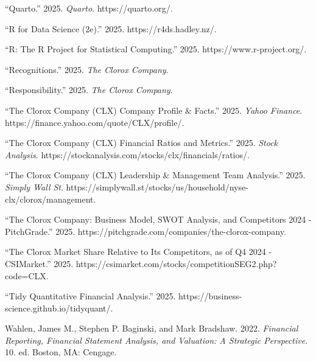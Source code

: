 \documentclass[
  letterpaper,
  DIV=11,
  numbers=noendperiod]{scrartcl}
\newlength{\cslhangindent}
\newenvironment{CSLReferences}[2] %
 {\begin{list}{}{%
  \setlength{\itemindent}{0pt}
  \setlength{\leftmargin}{0pt}
  \setlength{\parsep}{0pt}
  \ifodd #1
   \setlength{\leftmargin}{\cslhangindent}
   \setlength{\itemindent}{-1\cslhangindent}
  \fi
  \setlength{\itemsep}{#2\baselineskip}}}
 {\end{list}}
\begin{document}
\begin{CSLReferences}{1}{0}
{``Quarto.''} 2025. \emph{Quarto}. https://quarto.org/.

{``R for {Data Science} (2e).''} 2025. https://r4ds.hadley.nz/.

{``R: {The R Project} for {Statistical Computing}.''} 2025.
https://www.r-project.org/.

{``Recognitions.''} 2025. \emph{The Clorox Company}.

{``Responsibility.''} 2025. \emph{The Clorox Company}.

{``The {Clorox Company} ({CLX}) {Company Profile} \& {Facts}.''} 2025.
\emph{Yahoo Finance}. https://finance.yahoo.com/quote/CLX/profile/.

{``The {Clorox Company} ({CLX}) {Financial Ratios} and {Metrics}.''}
2025. \emph{Stock Analysis}.
https://stockanalysis.com/stocks/clx/financials/ratios/.

{``The {Clorox Company} ({CLX}) {Leadership} \& {Management Team
Analysis}.''} 2025. \emph{Simply Wall St}.
https://simplywall.st/stocks/us/household/nyse-clx/clorox/management.

{``The {Clorox Company}: {Business Model}, {SWOT Analysis}, and
{Competitors} 2024 - {PitchGrade}.''} 2025.
https://pitchgrade.com/companies/the-clorox-company.

{``The {Clorox Market} Share Relative to Its Competitors, as of {Q4}
2024 - {CSIMarket}.''} 2025.
https://csimarket.com/stocks/competitionSEG2.php?code=CLX.

{``Tidy {Quantitative Financial Analysis}.''} 2025.
https://business-science.github.io/tidyquant/.

Wahlen, James M., Stephen P. Baginski, and Mark Bradshaw. 2022.
\emph{Financial Reporting, Financial Statement Analysis, and Valuation:
A Strategic Perspective}. 10. ed. Boston, MA: Cengage.

\end{CSLReferences}
\end{document}
